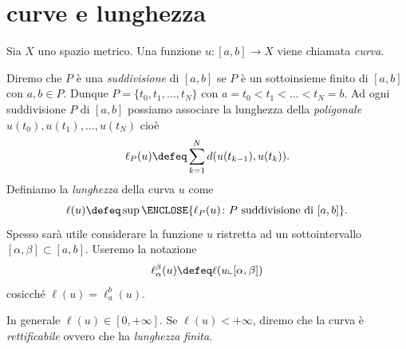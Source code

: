\chapter{curve e lunghezza}

Sia $X$ uno spazio metrico. Una funzione $u\colon [a,b] \to X$
viene chiamata \emph{curva}.

\begin{definition}
Diremo che $P$ è una \emph{suddivisione} di $[a,b]$ se
$P$ è un sottoinsieme finito di $[a,b]$ con $a,b\in P$.
Dunque $P = \{ t_0, t_1, \dots, t_N\}$ con $a= t_0 < t_1 < \dots < t_N = b$.
Ad ogni suddivisione $P$ di $[a,b]$ possiamo associare la
lunghezza della \emph{poligonale} $u(t_0), u(t_1), \dots, u(t_N)$ cioè
\[
  \ell_P(u) \defeq \sum_{k=1}^N d(u(t_{k-1}), u(t_k)).
\]
Definiamo la
\emph{lunghezza} della curva $u$ come
\[
    \ell(u) \defeq \sup \ENCLOSE{ \ell_P(u) \colon P \text{ suddivisione di } [a,b] }.
\]
Spesso sarà utile considerare la funzione $u$ ristretta ad un sottointervallo $[\alpha,\beta]\subset [a,b]$.
Useremo la notazione
\[
  \ell_\alpha^\beta(u) \defeq \ell(u \llcorner [\alpha,\beta])
\] 
cosicché $\ell(u) = \ell_a^b(u)$.

In generale $\ell(u)\in [0, +\infty]$.
Se $\ell(u) < +\infty$, diremo che la curva è \emph{rettificabile}
ovvero che ha \emph{lunghezza finita}.
\end{definition}

